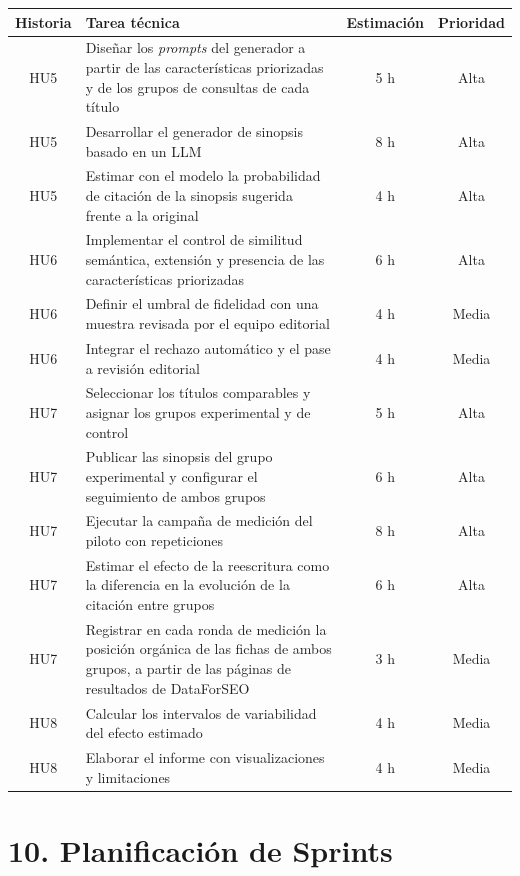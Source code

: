 \documentclass[
11pt, %
codirector, %
]{charter}
\begin{document}
\begin{table}[htpb]
\centering
\begin{tabularx}{\linewidth}{@{}|c|>{\raggedright\arraybackslash}X|c|c|@{}}
\hline
\rowcolor[HTML]{C0C0C0}
Historia & Tarea técnica & Estimación & Prioridad \\ \hline
HU5 & Diseñar los \textit{prompts} del generador a partir de las características priorizadas y de los grupos de consultas de cada título & 5 h & Alta \\ \hline
HU5 & Desarrollar el generador de sinopsis basado en un LLM & 8 h & Alta \\ \hline
HU5 & Estimar con el modelo la probabilidad de citación de la sinopsis sugerida frente a la original & 4 h & Alta \\ \hline
HU6 & Implementar el control de similitud semántica, extensión y presencia de las características priorizadas & 6 h & Alta \\ \hline
HU6 & Definir el umbral de fidelidad con una muestra revisada por el equipo editorial & 4 h & Media \\ \hline
HU6 & Integrar el rechazo automático y el pase a revisión editorial & 4 h & Media \\ \hline
HU7 & Seleccionar los títulos comparables y asignar los grupos experimental y de control & 5 h & Alta \\ \hline
HU7 & Publicar las sinopsis del grupo experimental y configurar el seguimiento de ambos grupos & 6 h & Alta \\ \hline
HU7 & Ejecutar la campaña de medición del piloto con repeticiones & 8 h & Alta \\ \hline
HU7 & Estimar el efecto de la reescritura como la diferencia en la evolución de la citación entre grupos & 6 h & Alta \\ \hline
HU7 & Registrar en cada ronda de medición la posición orgánica de las fichas de ambos grupos, a partir de las páginas de resultados de DataForSEO & 3 h & Media \\ \hline
HU8 & Calcular los intervalos de variabilidad del efecto estimado & 4 h & Media \\ \hline
HU8 & Elaborar el informe con visualizaciones y limitaciones & 4 h & Media \\ \hline
\end{tabularx}
\end{table}

\section{10. Planificación de Sprints}
\label{sec:sprints}
\end{document}
